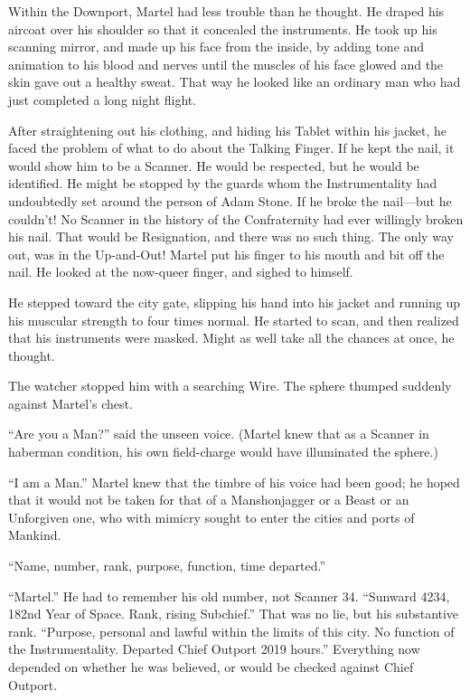 Within the Downport, Martel had less trouble than he thought. He draped his aircoat over his shoulder so that it concealed the instruments. He took up his scanning mirror, and made up his face from the inside, by adding tone and animation to his blood and nerves until the muscles of his face glowed and the skin gave out a healthy sweat. That way he looked like an ordinary man who had just completed a long night flight.

After straightening out his clothing, and hiding his Tablet within his jacket, he faced the problem of what to do about the Talking Finger. If he kept the nail, it would show him to be a Scanner. He would be respected, but he would be identified. He might be stopped by the guards whom the Instrumentality had undoubtedly set around the person of Adam Stone. If he broke the nail---but he couldn't! No Scanner in the history of the Confraternity had ever willingly broken his nail. That would be Resignation, and there was no such thing. The only way out, was in the Up-and-Out! Martel put his finger to his mouth and bit off the nail. He looked at the now-queer finger, and sighed to himself.

He stepped toward the city gate, slipping his hand into his jacket and running up his muscular strength to four times normal. He started to scan, and then realized that his instruments were masked. Might as well take all the chances at once, he thought.

The watcher stopped him with a searching Wire. The sphere thumped suddenly against Martel's chest.

``Are you a Man?'' said the unseen voice. (Martel knew that as a Scanner in haberman condition, his own field-charge would have illuminated the sphere.)

``I am a Man.'' Martel knew that the timbre of his voice had been good; he hoped that it would not be taken for that of a Manshonjagger or a Beast or an Unforgiven one, who with mimicry sought to enter the cities and ports of Mankind.

``Name, number, rank, purpose, function, time departed.''

``Martel.'' He had to remember his old number, not Scanner 34. ``Sunward 4234, 182nd Year of Space. Rank, rising Subchief.'' That was no lie, but his substantive rank. ``Purpose, personal and lawful within the limits of this city. No function of the Instrumentality. Departed Chief Outport 2019 hours.'' Everything now depended on whether he was believed, or would be checked against Chief Outport.

